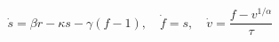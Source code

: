 \documentclass{article}
\begin{document}
\fontsize{22}{29}\selectfont
\[
\dot s=\beta r-\kappa s-\gamma(f-1),\quad\dot f=s,\quad\dot v=\frac{f-v^{1/\alpha}}{\tau}
\]
\end{document}
